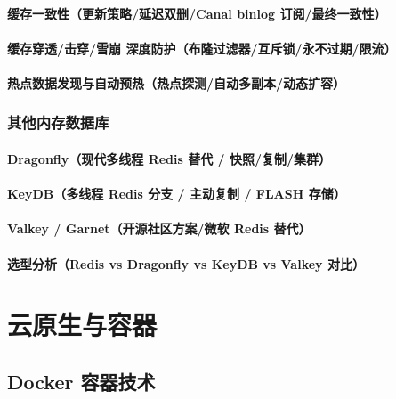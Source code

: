 \documentclass[12pt,UTF8]{ctexbook}
\begin{document}
    \subsection{缓存一致性（更新策略/延迟双删/Canal binlog 订阅/最终一致性）}
    \subsection{缓存穿透/击穿/雪崩 深度防护（布隆过滤器/互斥锁/永不过期/限流）}
    \subsection{热点数据发现与自动预热（热点探测/自动多副本/动态扩容）}

  \section{其他内存数据库}
    \subsection{Dragonfly（现代多线程 Redis 替代 / 快照/复制/集群）}
    \subsection{KeyDB（多线程 Redis 分支 / 主动复制 / FLASH 存储）}
    \subsection{Valkey / Garnet（开源社区方案/微软 Redis 替代）}
    \subsection{选型分析（Redis vs Dragonfly vs KeyDB vs Valkey 对比）}



\part{云原生与容器}

\chapter{Docker 容器技术}
\label{chap:docker}
\end{document}
